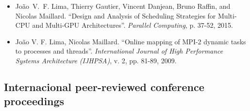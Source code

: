 \documentclass[11pt,a4paper]{article}
\begin{document}
\begin{itemize} \itemsep -2pt
\item 
João~V.~F. Lima, Thierry Gautier, Vincent Danjean, Bruno Raffin, and Nicolas Maillard.
``Design and Analysis of Scheduling Strategies for Multi-CPU and Multi-GPU Architectures''.
\emph{Parallel Computing}, p. 37-52, 2015.


\item João V. F. Lima, Nicolas Maillard.
``Online mapping of MPI-2 dynamic tasks to processes and threads''.
\emph{International Journal of High Performance Systems Architecture (IJHPSA)}, v. 2, pp. 81-89, 2009.
\end{itemize}

\subsection{Internacional peer-reviewed conference proceedings}
\end{document}
